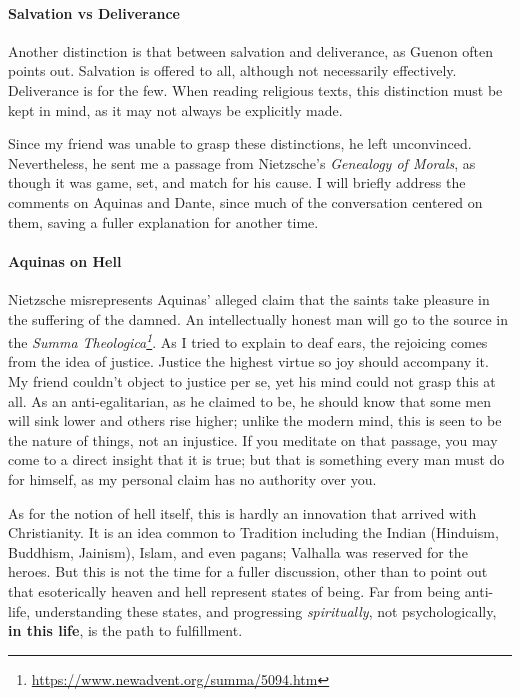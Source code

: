 \paragraph{Salvation vs Deliverance}


Another distinction is that between salvation and deliverance, as Guenon often points out. Salvation is offered to all, although not necessarily effectively. Deliverance is for the few. When reading religious texts, this distinction must be kept in mind, as it may not always be explicitly made.

Since my friend was unable to grasp these distinctions, he left unconvinced. Nevertheless, he sent me a passage from Nietzsche's \emph{Genealogy of Morals}, as though it was game, set, and match for his cause. I will briefly address the comments on Aquinas and Dante, since much of the conversation centered on them, saving a fuller explanation for another time.

\paragraph{Aquinas on Hell}


Nietzsche misrepresents Aquinas' alleged claim that the saints take pleasure in the suffering of the damned. An intellectually honest man will go to the source in the \emph{Summa Theologica\footnote{\url{https://www.newadvent.org/summa/5094.htm}}}. As I tried to explain to deaf ears, the rejoicing comes from the idea of justice. Justice the highest virtue so joy should accompany it. My friend couldn't object to justice per se, yet his mind could not grasp this at all. As an anti-egalitarian, as he claimed to be, he should know that some men will sink lower and others rise higher; unlike the modern mind, this is seen to be the nature of things, not an injustice. If you meditate on that passage, you may come to a direct insight that it is true; but that is something every man must do for himself, as my personal claim has no authority over you.

As for the notion of hell itself, this is hardly an innovation that arrived with Christianity. It is an idea common to Tradition including the Indian (Hinduism, Buddhism, Jainism), Islam, and even pagans; Valhalla was reserved for the heroes. But this is not the time for a fuller discussion, other than to point out that esoterically heaven and hell represent states of being. Far from being anti-life, understanding these states, and progressing \emph{spiritually}, not psychologically, \textbf{in this life}, is the path to fulfillment.


